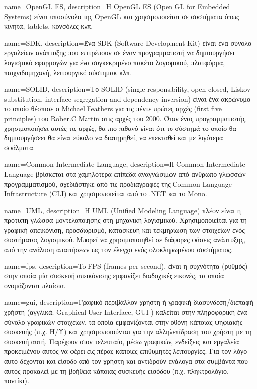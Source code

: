 {
	name=OpenGL ES,
	description={H OpenGL ES (Open GL for Embedded Systems) είναι υποσύνολο της OpenGL και χρησιμοποιείται σε συστήματα όπως κινητά, tablets, κονσόλες κλπ.}
}


{
	name=SDK,
	description={Ένα SDK (Software Development Kit) είναι ένα σύνολο εργαλείων ανάπτυξης που επιτρέπουν σε έναν προγραμματιστή να δημιουργήσει λογισμικό εφαρμογών για ένα συγκεκριμένο πακέτο λογισμικού, πλατφόρμα, παιχνιδομηχανή, λειτουργικό σύστημακ κλπ.}
}

{
	name=SOLID,
	description={Το SOLID (single responsibility, open-closed, Liskov substitution, interface segregation and dependency inversion) είναι ένα ακρώνυμο το οποίο θέσπισε ο Michael Feathers για τις πέντε πρώτες αρχές (first five principles) του Rober.C Martin στις αρχές του 2000. Όταν ένας προγραμματιστής χρησιμοποιήσει αυτές τις αρχές, θα πιο πιθανό είναι ότι το σύστημά το οποίο θα δημιουργήσεει θα είναι εύκολο να διατηρηθεί, να επεκταθεί και με λιγότερα σφάλματα.}
}

{
	name=Common Intermediate Language,
	description={Η Common Intermediate Language βρίσκεται στα χαμηλότερα επίπεδα αναγνώσιμων από ανθρωπο γλωσσών προγραμματισμού, σχεδιάστηκε από τις προδιαγραφές της Common Language Infrastructure (CLI) και χρησιμοποιείται από το .ΝΕΤ και το Μono.}
}

{
	name=UML,
	description={Η UML (Unified Modeling Language) πλέον είναι η πρότυπη γλώσσα μοντελοποίησης στη μηχανική λογισμικού. Χρησιμοποιείται για τη γραφική απεικόνιση, προσδιορισμό, κατασκευή και τεκμηρίωση των στοιχείων ενός συστήματος λογισμικού. Μπορεί να χρησιμοποιηθεί σε διάφορες φάσεις ανάπτυξης, από την ανάλυση απαιτήσεων ως τον έλεγχο ενός ολοκληρωμένου συστήματος.}
}

{
	name={fps},
	description={To FPS (frames per second), είναι η συχνότητα (ρυθμός) στην οποία μία συσκευή απεικόνισης εμφανίζει διαδοχικές εικονές, τα οποία ονομάζονται πλαίσια.}
}

{
	name={gui},
	description={Γραφικό περιβάλλον χρήστη ή γραφική διασύνδεση/διεπαφή χρήστη (αγγλικά: Graphical User Interface, GUI ) καλείται στην πληροφορική ένα σύνολο γραφικών στοιχείων, τα οποία εμφανίζονται στην οθόνη κάποιας ψηφιακής συσκευής (π.χ. Η/Υ) και χρησιμοποιούνται για την αλληλεπίδραση του χρήστη με τη συσκευή αυτή. Παρέχουν στον τελευταίο, μέσω γραφικών, ενδείξεις και εργαλεία προκειμένου αυτός να φέρει εις πέρας κάποιες επιθυμητές λειτουργίες. Για τον λόγο αυτό δέχονται και είσοδο από τον χρήστη και αντιδρούν ανάλογα στα συμβάντα που αυτός προκαλεί με τη βοήθεια κάποιας συσκευής εισόδου (π.χ. πληκτρολόγιο, ποντίκι).}		
}

